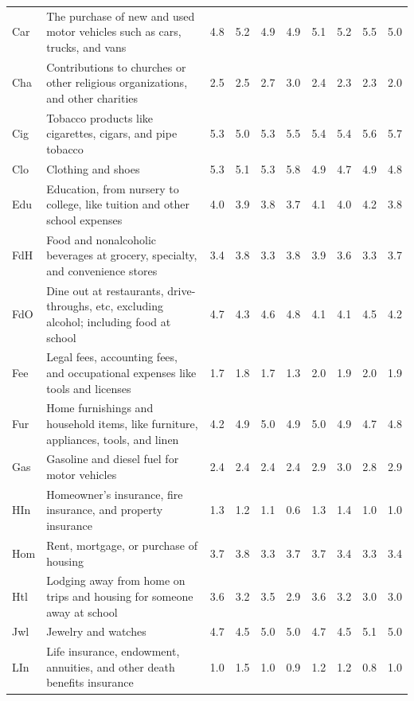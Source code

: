 \documentclass[11pt]{article}
\begin{document}
\begin{CJK}{UTF8}{gbsn}
\begin{table}[!ht]
{\begin{tabular}{lp{40mm}llllllll}
        Car & {\tiny  The purchase of new and used motor vehicles such as cars, trucks, and vans}& 4.8 & 5.2 & 4.9 & 4.9 & 5.1 & 5.2 & 5.5 & 5.0\\
        Cha & {\tiny  Contributions to churches or other religious organizations, and other charities}& 2.5 & 2.5 & 2.7 & 3.0 & 2.4 & 2.3 & 2.3 & 2.0\\
        Cig & {\tiny  Tobacco products like cigarettes, cigars, and pipe tobacco}& 5.3 & 5.0 & 5.3 & 5.5 & 5.4 & 5.4 & 5.6 & 5.7\\
        Clo & {\tiny  Clothing and shoes }& 5.3 & 5.1 & 5.3 & 5.8 & 4.9 & 4.7 & 4.9 & 4.8\\
        Edu & {\tiny  Education, from nursery to college, like tuition and other school expenses}& 4.0 & 3.9 & 3.8 & 3.7 & 4.1 & 4.0 & 4.2 & 3.8\\
        FdH & {\tiny  Food and nonalcoholic beverages at grocery, specialty, and convenience stores}& 3.4 & 3.8 & 3.3 & 3.8 & 3.9 & 3.6 & 3.3 & 3.7\\
        FdO & {\tiny  Dine out at restaurants, drive-throughs, etc, excluding alcohol; including food at school}& 4.7 & 4.3 & 4.6 & 4.8 & 4.1 & 4.1 & 4.5 & 4.2\\
        Fee & {\tiny  Legal fees, accounting fees, and occupational expenses like tools and licenses}& 1.7 & 1.8 & 1.7 & 1.3 & 2.0 & 1.9 & 2.0 & 1.9\\
        Fur & {\tiny  Home furnishings and household items, like furniture, appliances, tools, and linen}& 4.2 & 4.9 & 5.0 & 4.9 & 5.0 & 4.9 & 4.7 & 4.8\\
        Gas & {\tiny  Gasoline and diesel fuel for motor vehicles}& 2.4 & 2.4 & 2.4 & 2.4 & 2.9 & 3.0 & 2.8 & 2.9\\
        HIn & {\tiny  Homeowner’s insurance, fire insurance, and property insurance}& 1.3 & 1.2 & 1.1 & 0.6 & 1.3 & 1.4 & 1.0 & 1.0\\
        Hom & {\tiny  Rent, mortgage, or purchase of housing}& 3.7 & 3.8 & 3.3 & 3.7 & 3.7 & 3.4 & 3.3 & 3.4\\
        Htl & {\tiny  Lodging away from home on trips and housing for someone away at school}& 3.6 & 3.2 & 3.5 & 2.9 & 3.6 & 3.2 & 3.0 & 3.0\\
        Jwl & {\tiny  Jewelry and watches}& 4.7 & 4.5 & 5.0 & 5.0 & 4.7 & 4.5 & 5.1 & 5.0\\
        LIn & {\tiny  Life insurance, endowment, annuities, and other death benefits insurance}& 1.0 & 1.5 & 1.0 & 0.9 & 1.2 & 1.2 & 0.8 & 1.0\\

\end{tabular}}
\end{table}
\end{CJK}
\end{document}
